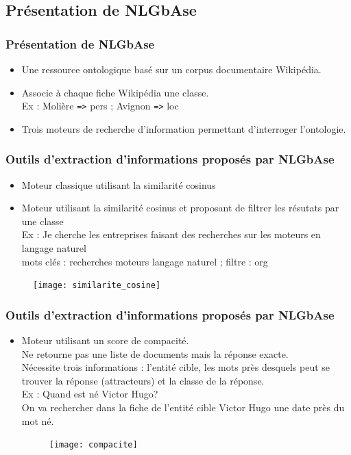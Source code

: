 \documentclass[xcolor=dvipsnames]{beamer}
\begin{document}
\subsection{Présentation de NLGbAse}
\frame
{
    \frametitle{Présentation de NLGbAse}
    \begin{itemize}
        \item<1-> Une ressource ontologique basé sur un corpus documentaire Wikipédia.
        \item<2-> Associe à chaque fiche Wikipédia une classe. \\
            Ex : Molière \texttt{=>} pers ; Avignon \texttt{=>} loc
        \item<3-> Trois moteurs de recherche d'information permettant d'interroger l'ontologie.
    \end{itemize}
}
\frame
{
    \frametitle{Outils d'extraction d'informations proposés par NLGbAse}
    \begin{itemize}
        \item<1-> Moteur classique utilisant la similarité cosinus
        \item<2-> Moteur utilisant la similarité cosinus et proposant de filtrer les résutats par une classe \\
                Ex : Je cherche les entreprises faisant des recherches sur les moteurs en langage naturel \\
                mots clés : recherches moteurs langage naturel ; filtre : org
   \end{itemize}
    \begin{figure}
        \texttt{[image: similarite\_cosine]}
    \end{figure}

}
\frame
{
    \frametitle{Outils d'extraction d'informations proposés par NLGbAse}
    \begin{itemize}
        \item<1-> Moteur utilisant un score de compacité. \\
               Ne retourne pas une liste de documents mais la réponse exacte. \\
               Nécessite trois informations : l'entité cible, les mots près desquels peut se trouver la réponse (attracteurs) et la classe de la réponse.\\
               Ex : Quand est né Victor Hugo? \\
               On va rechercher dans la fiche de l'entité cible Victor Hugo une date près du mot \og{}né\fg{}.
    \begin{figure}
        \texttt{[image: compacite]}
     \end{figure}
   \end{itemize}
}
 
\end{document}

